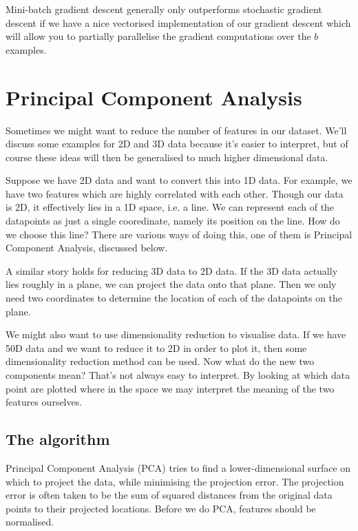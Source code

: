 \documentclass[a4paper, 10pt,hidelinks]{article}
\begin{document}

Mini-batch gradient descent generally only outperforms stochastic gradient descent if we have a nice vectorised implementation of our gradient descent which will allow you to partially parallelise the gradient computations over the $b$ examples. 

\section{Principal Component Analysis}
Sometimes we might want to reduce the number of features in our dataset. We'll discuss some examples for 2D and 3D data because it's easier to interpret, but of course these ideas will then be generalised to much higher dimensional data. 

Suppose we have 2D data and want to convert this into 1D data. For example, we have two features which are highly correlated with each other. Though our data is 2D, it effectively lies in a 1D space, i.e. a line. We can represent each of the datapoints as just a single cooredinate, namely its position on the line. How do we choose this line? There are various ways of doing this, one of them is Principal Component Analysis, discussed below. 

A similar story holds for reducing 3D data to 2D data. If the 3D data actually lies roughly in a plane, we can project the data onto that plane. Then we only need two coordinates to determine the location of each of the datapoints on the plane. 


We might also want to use dimensionality reduction to visualise data. If we have 50D data and we want to reduce it to 2D in order to plot it, then some dimensionality reduction method can be used. Now what do the new two components mean? That's not always easy to interpret. By looking at which data point are plotted where in the space we may interpret the meaning of the two features ourselves. 

\subsection{The algorithm}
Principal Component Analysis (PCA) tries to find a lower-dimensional surface on which to project the data, while minimising the projection error. The projection error is often taken to be the sum of squared distances from the original data points to their projected locations. Before we do PCA, features should be normalised. 
\end{document}
